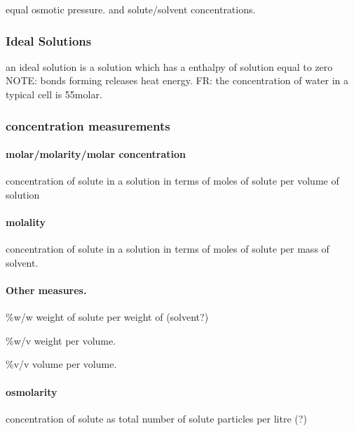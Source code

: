 \documentclass[]{article}
\let\oldparagraph\paragraph
\renewcommand{\paragraph}[1]{\oldparagraph{#1}\mbox{}}
\begin{document}
equal osmotic pressure. and solute/solvent concentrations.

\hypertarget{ideal-solutions}{%
\subsubsection{Ideal Solutions}\label{ideal-solutions}}

an ideal solution is a solution which has a enthalpy of solution equal
to zero NOTE: bonds forming releases heat energy. FR: the concentration
of water in a typical cell is 55molar.

\hypertarget{concentration-measurements}{%
\subsubsection{concentration
measurements}\label{concentration-measurements}}

\hypertarget{molarmolaritymolar-concentration}{%
\paragraph{molar/molarity/molar
concentration}\label{molarmolaritymolar-concentration}}

concentration of solute in a solution in terms of moles of solute per
volume of solution

\hypertarget{molality}{%
\paragraph{molality}\label{molality}}

concentration of solute in a solution in terms of moles of solute per
mass of solvent.

\hypertarget{other-measures.}{%
\paragraph{Other measures.}\label{other-measures.}}

\%w/w weight of solute per weight of (solvent?)

\%w/v weight per volume.

\%v/v volume per volume.

\hypertarget{osmolarity}{%
\paragraph{osmolarity}\label{osmolarity}}

concentration of solute as total number of solute particles per litre
(?)
\end{document}
